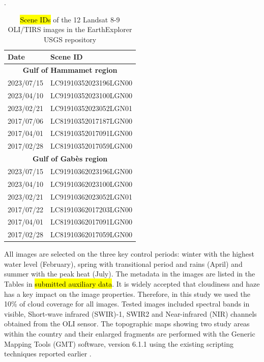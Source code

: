 \documentclass[land,article,submit,pdftex,moreauthors]{Definitions/mdpi}
\begin{document}
\begin{table}[H]
\caption{\hl{Scene IDs} of the 12 Landsat 8-9 OLI/TIRS images in the EarthExplorer USGS repository}.
\label{tab01}
\footnotesize
\begin{tabularx}{7cm}{l|l}

			\toprule
			\textbf{Date} & \textbf{Scene ID} \\
			\midrule
			\multicolumn{2}{c}{\textbf{Gulf of Hammamet region}}\\
			\midrule
			2023/07/15 & LC91910352023196LGN00 \\	
			2023/04/10 & LC91910352023100LGN00 \\	
			2023/02/21 & LC91910352023052LGN01 \\	
			2017/07/06 & LC81910352017187LGN00 \\	
			2017/04/01 & LC81910352017091LGN00 \\	
			2017/02/28 & LC81910352017059LGN00 \\	
			\midrule
			\multicolumn{2}{c}{\textbf{Gulf of Gabès region}}\\
			\midrule
			2023/07/15 & LC91910362023196LGN00 \\	
			2023/04/10 & LC91910362023100LGN00 \\	
			2023/02/21 & LC91910362023052LGN01 \\	
			2017/07/22 & LC81910362017203LGN00 \\
			2017/04/01 & LC81910362017091LGN00 \\
			2017/02/28 & LC81910362017059LGN00 \\
			\bottomrule
		\end{tabularx}
\end{table} 

All images are selected on the three key control periods: winter with the highest water level (February), spring with transitional period and rains (April) and summer with the peak heat (July). The metadata in the images are listed in the Tables in \hl{submitted auxiliary data}. It is widely accepted that cloudiness and haze has a key impact on the image properties. Therefore, in this study we used the 10\% of cloud coverage for all images. Tested images included spectral bands in visible, Short-wave infrared (SWIR)-1, SWIR2 and Near-infrared (NIR) channels obtained from the OLI sensor. The topographic maps showing two study areas within the country and their enlarged fragments are performed with the Generic Mapping Tools (GMT) software, version  6.1.1 \cite{Wessel} using the existing scripting techniques reported earlier \cite{Lemenkova202212,Lemenkova202206}. 
\end{document}

